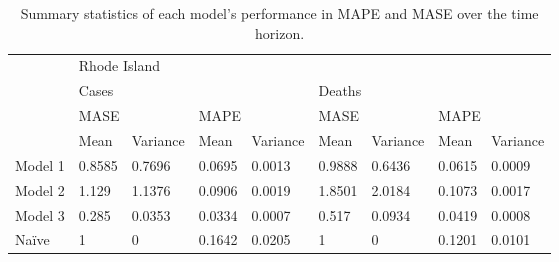 

\begin{table}[h]
\centering
\caption{Summary statistics of each model's performance in MAPE and MASE over the time horizon.}\label{table:summary}
\begin{tabular}{|l|llll|llll|} 
\hline
        & \multicolumn{8}{l|}{Rhode Island}                                                                                                                                                                    \\ 
\cline{2-9}
        & \multicolumn{4}{l|}{Cases}                                                                       & \multicolumn{4}{l|}{Deaths}                                                                       \\ 
\cline{2-9}
        & \multicolumn{2}{l|}{MASE}                                 & \multicolumn{2}{l|}{MAPE}            & \multicolumn{2}{l|}{MASE}                                 & \multicolumn{2}{l|}{MAPE}             \\ 
\cline{2-9}
        & \multicolumn{1}{l|}{Mean} & \multicolumn{1}{l|}{Variance} & \multicolumn{1}{l|}{Mean} & Variance & \multicolumn{1}{l|}{Mean} & \multicolumn{1}{l|}{Variance} & \multicolumn{1}{l|}{Mean} & Variance  \\ 
\hline
Model 1 & 0.8585                    & 0.7696                        & 0.0695                    & 0.0013   & 0.9888                    & 0.6436                        & 0.0615                    & 0.0009    \\
Model 2 & 1.129                     & 1.1376                        & 0.0906                    & 0.0019   & 1.8501                    & 2.0184                        & 0.1073                    & 0.0017    \\
Model 3 & 0.285                     & 0.0353                        & 0.0334                    & 0.0007   & 0.517                     & 0.0934                        & 0.0419                    & 0.0008    \\
Na\"ive   & 1                         & 0                             & 0.1642                    & 0.0205   & 1                         & 0                             & 0.1201                    & 0.0101    \\ 

\end{tabular}
\end{table}
